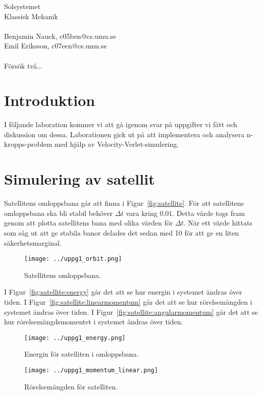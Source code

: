 \documentclass[a4]{article}
\begin{document}
{
\Large
Solsystemet\\
Klassisk Mekanik\\
~\\
Benjamin Nauck, c05ben@cs.umu.se\\
Emil Eriksson, c07een@cs.umu.se\\
~\\
Försök två...
}
\clearpage

\section{Introduktion}
I följande laboration kommer vi att gå igenom svar på uppgifter vi fått och
diskussion om dessa.
Laborationen gick ut på att implementera och analysera n-kropps-problem med
hjälp av Velocity-Verlet-simulering.

\section{Simulering av satellit}
Satellitens omloppsbana går att finna i Figur~\vref{fig:satellite}.
För att satellitens omloppsbana ska bli stabil behöver $\Delta t$ vara kring
$0.01$.
Detta värde togs fram genom att plotta satellitens bana med olika värden för $\Delta t$.
När ett värde hittats som såg ut att ge stabila banor delades det sedan med 10
för att ge en liten säkerhetsmarginal.

\begin{figure}
\begin{center}
	\texttt{[image: ../uppg1\_orbit.png]}
\end{center}
\caption{Satellitens omloppsbana.}
\label{fig:satellite}
\end{figure}

I Figur~\vref{fig:satellite:energy} går det att se hur energin i systemet ändras
över tiden.
I Figur~\vref{fig:satellite:linearmomentum} går det att se hur rörelsemängden i
systemet ändras över tiden.
I Figur~\vref{fig:satellite:angularmomentum} går det att se hur
rörelsemängdsmomentet i systemet ändras över tiden.

\begin{figure}
\begin{center}
	\texttt{[image: ../uppg1\_energy.png]}
\end{center}
\caption{Energin för satelliten i omloppsbana.}
\label{fig:satellite:energy}
\end{figure}

\begin{figure}
\begin{center}
	\texttt{[image: ../uppg1\_momentum\_linear.png]}
\end{center}
\caption{Rörelsemängden för satelliten.}
\label{fig:satellite:linearmomentum}
\end{figure}
\end{document}
